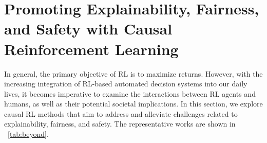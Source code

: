 \documentclass[10pt]{article} %
\theoremstyle{definition}
\begin{document}
%
%
\section{Promoting Explainability, Fairness, and Safety with Causal Reinforcement Learning}
\label{sec:6beyond}

In general, the primary objective of RL is to maximize returns. However, with the increasing integration of RL-based automated decision systems into our daily lives, it becomes imperative to examine the interactions between RL agents and humans, as well as their potential societal implications. In this section, we explore causal RL methods that aim to address and alleviate challenges related to explainability, fairness, and safety. The representative works are shown in \tablename~\ref{tab:beyond}.
\end{document}
